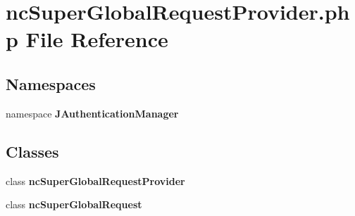\section{ncSuperGlobalRequestProvider.php File Reference}
\label{ncSuperGlobalRequestProvider_8php}
\subsection*{Namespaces}
\begin{CompactItemize}
\item 
namespace {\bf JAuthenticationManager}
\end{CompactItemize}
\subsection*{Classes}
\begin{CompactItemize}
\item 
class {\bf ncSuperGlobalRequestProvider}
\item 
class {\bf ncSuperGlobalRequest}
\end{CompactItemize}
